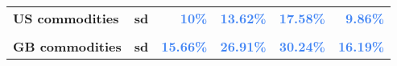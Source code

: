 \documentclass[
  authoryear,
  preprint,
  3p]{elsarticle}
\begin{document}
\begin{longtable}[t]{>{}l>{}l>{}r>{}r>{}r>{}r}
\textbf{US commodities} & \textbf{sd} & \textcolor[HTML]{4285f4}{\textbf{10\%}} & \textcolor[HTML]{4285f4}{\textbf{13.62\%}} & \textcolor[HTML]{4285f4}{\textbf{17.58\%}} & \textcolor[HTML]{4285f4}{\textbf{9.86\%}}\\
\textbf{\cellcolor{gray!10}{GB commodities}} & \textbf{\cellcolor{gray!10}{mean}} & \textcolor[HTML]{4285f4}{\textbf{\cellcolor{gray!10}{2.47\%}}} & \textcolor[HTML]{4285f4}{\textbf{\cellcolor{gray!10}{*21.77\%}}} & \textcolor[HTML]{4285f4}{\textbf{\cellcolor{gray!10}{5.25\%}}} & \textcolor[HTML]{4285f4}{\textbf{\cellcolor{gray!10}{2.72\%}}}\\
\textbf{GB commodities} & \textbf{sd} & \textcolor[HTML]{4285f4}{\textbf{15.66\%}} & \textcolor[HTML]{4285f4}{\textbf{26.91\%}} & \textcolor[HTML]{4285f4}{\textbf{30.24\%}} & \textcolor[HTML]{4285f4}{\textbf{16.19\%}}\\
\bottomrule

\end{longtable}

\endgroup{}

\newpage

\begingroup\fontsize{7}{9}\selectfont
\end{document}

